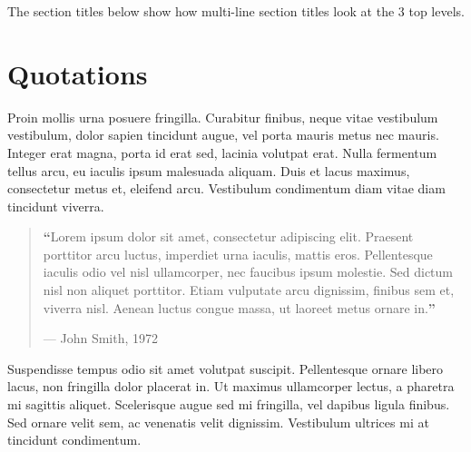 \documentclass[
	a4paper, %
	12pt, %
]{include/CSSullivanBusinessReport}
\begin{document}
The section titles below show how multi-line section titles look at the 3 top levels.



\section{Quotations}

Proin mollis urna posuere fringilla. Curabitur finibus, neque vitae vestibulum vestibulum, dolor sapien tincidunt augue, vel porta mauris metus nec mauris. Integer erat magna, porta id erat sed, lacinia volutpat erat. Nulla fermentum tellus arcu, eu iaculis ipsum malesuada aliquam. Duis et lacus maximus, consectetur metus et, eleifend arcu. Vestibulum condimentum diam vitae diam tincidunt viverra. %

\begin{quote}
	\textbf{\LARGE ``}Lorem ipsum dolor sit amet, consectetur adipiscing elit. Praesent porttitor arcu luctus, imperdiet urna iaculis, mattis eros. Pellentesque iaculis odio vel nisl ullamcorper, nec faucibus ipsum molestie. Sed dictum nisl non aliquet porttitor. Etiam vulputate arcu dignissim, finibus sem et, viverra nisl. Aenean luctus congue massa, ut laoreet metus ornare in.\textbf{''}
	
	\hfill--- John Smith, 1972
\end{quote}

Suspendisse tempus odio sit amet volutpat suscipit. Pellentesque ornare libero lacus, non fringilla dolor placerat in. Ut maximus ullamcorper lectus, a pharetra mi sagittis aliquet. Scelerisque augue sed mi fringilla, vel dapibus ligula finibus. Sed ornare velit sem, ac venenatis velit dignissim. Vestibulum ultrices mi at tincidunt condimentum.

\end{document}
